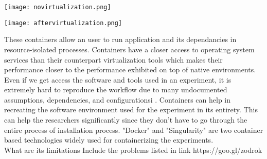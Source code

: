 \begin{center}
\begin{minipage}{0.48\linewidth}
\texttt{[image: novirtualization.png]}
\label{fig:novirtualization}
\end{minipage}%
\hfill
\begin{minipage}{0.48\linewidth}
\texttt{[image: aftervirtualization.png]}
\label{fig:aftervirtualization}
\end{minipage}
\end{center}

These containers allow an user to run application and its dependancies in resource-isolated processes. Containers have a closer access to operating system services than their counterpart virtualization tools which makes their performance closer to the performance exhibited on top of native environments\cite{Xavier:2013:PEC:2497369.2497577}.\\

Even if we get access the software and tools used in an experiment, it is extremely hard to reproduce the workflow due to many undocumented assumptions, dependencies, and configurationsi \cite{7883438}. Containers can help in recreating the software environment used for the experiment in its entirety. This can help the researchers significantly since they don't have to go through the entire process of installation process. "Docker" and "Singularity" are two container based technologies widely used for containerizing the experiments.\\


What are its limitations
Include the problems listed in link https://goo.gl/zodrok\\

